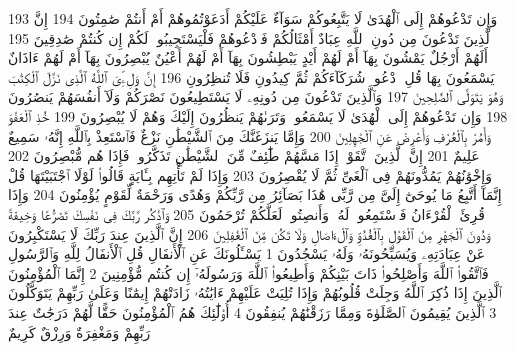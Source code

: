 {\tiny\colorbox{cl_aya}{193}} وَإِن تَدْعُوهُمْ إِلَى ٱلْهُدَىٰ لَا يَتَّبِعُوكُمْ سَوَآءٌ عَلَيْكُمْ أَدَعَوْتُمُوهُمْ أَمْ أَنتُمْ صَٰمِتُونَ
{\tiny\colorbox{cl_aya}{194}} إِنَّ ٱلَّذِينَ تَدْعُونَ مِن دُونِ ٱللَّهِ عِبَادٌ أَمْثَالُكُمْ فَٱدْعُوهُمْ فَلْيَسْتَجِيبُوا۟ لَكُمْ إِن كُنتُمْ صَٰدِقِينَ
{\tiny\colorbox{cl_aya}{195}} أَلَهُمْ أَرْجُلٌ يَمْشُونَ بِهَآ أَمْ لَهُمْ أَيْدٍ يَبْطِشُونَ بِهَآ أَمْ لَهُمْ أَعْيُنٌ يُبْصِرُونَ بِهَآ أَمْ لَهُمْ ءَاذَانٌ يَسْمَعُونَ بِهَا قُلِ ٱدْعُوا۟ شُرَكَآءَكُمْ ثُمَّ كِيدُونِ فَلَا تُنظِرُونِ
{\tiny\colorbox{cl_aya}{196}} إِنَّ وَلِۦِّىَ ٱللَّهُ ٱلَّذِى نَزَّلَ ٱلْكِتَٰبَ وَهُوَ يَتَوَلَّى ٱلصَّٰلِحِينَ
{\tiny\colorbox{cl_aya}{197}} وَٱلَّذِينَ تَدْعُونَ مِن دُونِهِۦ لَا يَسْتَطِيعُونَ نَصْرَكُمْ وَلَآ أَنفُسَهُمْ يَنصُرُونَ
{\tiny\colorbox{cl_aya}{198}} وَإِن تَدْعُوهُمْ إِلَى ٱلْهُدَىٰ لَا يَسْمَعُوا۟ وَتَرَىٰهُمْ يَنظُرُونَ إِلَيْكَ وَهُمْ لَا يُبْصِرُونَ
{\tiny\colorbox{cl_aya}{199}} خُذِ ٱلْعَفْوَ وَأْمُرْ بِٱلْعُرْفِ وَأَعْرِضْ عَنِ ٱلْجَٰهِلِينَ
{\tiny\colorbox{cl_aya}{200}} وَإِمَّا يَنزَغَنَّكَ مِنَ ٱلشَّيْطَٰنِ نَزْغٌ فَٱسْتَعِذْ بِٱللَّهِ إِنَّهُۥ سَمِيعٌ عَلِيمٌ
{\tiny\colorbox{cl_aya}{201}} إِنَّ ٱلَّذِينَ ٱتَّقَوْا۟ إِذَا مَسَّهُمْ طَٰٓئِفٌ مِّنَ ٱلشَّيْطَٰنِ تَذَكَّرُوا۟ فَإِذَا هُم مُّبْصِرُونَ
{\tiny\colorbox{cl_aya}{202}} وَإِخْوَٰنُهُمْ يَمُدُّونَهُمْ فِى ٱلْغَىِّ ثُمَّ لَا يُقْصِرُونَ
{\tiny\colorbox{cl_aya}{203}} وَإِذَا لَمْ تَأْتِهِم بِـَٔايَةٍ قَالُوا۟ لَوْلَا ٱجْتَبَيْتَهَا قُلْ إِنَّمَآ أَتَّبِعُ مَا يُوحَىٰٓ إِلَىَّ مِن رَّبِّى هَٰذَا بَصَآئِرُ مِن رَّبِّكُمْ وَهُدًى وَرَحْمَةٌ لِّقَوْمٍ يُؤْمِنُونَ
{\tiny\colorbox{cl_aya}{204}} وَإِذَا قُرِئَ ٱلْقُرْءَانُ فَٱسْتَمِعُوا۟ لَهُۥ وَأَنصِتُوا۟ لَعَلَّكُمْ تُرْحَمُونَ
{\tiny\colorbox{cl_aya}{205}} وَٱذْكُر رَّبَّكَ فِى نَفْسِكَ تَضَرُّعًا وَخِيفَةً وَدُونَ ٱلْجَهْرِ مِنَ ٱلْقَوْلِ بِٱلْغُدُوِّ وَٱلْءَاصَالِ وَلَا تَكُن مِّنَ ٱلْغَٰفِلِينَ
{\tiny\colorbox{cl_aya}{206}} إِنَّ ٱلَّذِينَ عِندَ رَبِّكَ لَا يَسْتَكْبِرُونَ عَنْ عِبَادَتِهِۦ وَيُسَبِّحُونَهُۥ وَلَهُۥ يَسْجُدُونَ
{\tiny\colorbox{cl_aya}{1}} يَسْـَٔلُونَكَ عَنِ ٱلْأَنفَالِ قُلِ ٱلْأَنفَالُ لِلَّهِ وَٱلرَّسُولِ فَٱتَّقُوا۟ ٱللَّهَ وَأَصْلِحُوا۟ ذَاتَ بَيْنِكُمْ وَأَطِيعُوا۟ ٱللَّهَ وَرَسُولَهُۥٓ إِن كُنتُم مُّؤْمِنِينَ
{\tiny\colorbox{cl_aya}{2}} إِنَّمَا ٱلْمُؤْمِنُونَ ٱلَّذِينَ إِذَا ذُكِرَ ٱللَّهُ وَجِلَتْ قُلُوبُهُمْ وَإِذَا تُلِيَتْ عَلَيْهِمْ ءَايَٰتُهُۥ زَادَتْهُمْ إِيمَٰنًا وَعَلَىٰ رَبِّهِمْ يَتَوَكَّلُونَ
{\tiny\colorbox{cl_aya}{3}} ٱلَّذِينَ يُقِيمُونَ ٱلصَّلَوٰةَ وَمِمَّا رَزَقْنَٰهُمْ يُنفِقُونَ
{\tiny\colorbox{cl_aya}{4}} أُو۟لَٰٓئِكَ هُمُ ٱلْمُؤْمِنُونَ حَقًّا لَّهُمْ دَرَجَٰتٌ عِندَ رَبِّهِمْ وَمَغْفِرَةٌ وَرِزْقٌ كَرِيمٌ
